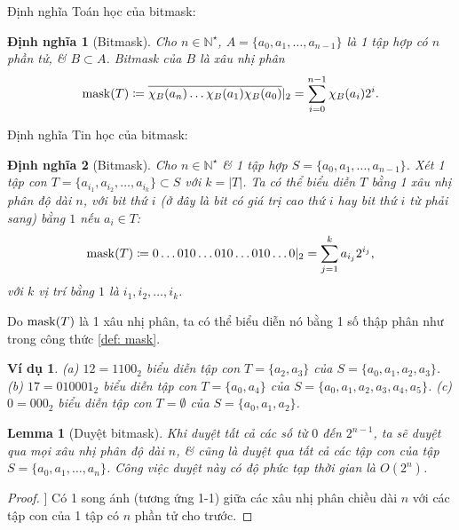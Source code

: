 \documentclass{article}
\newtheorem{dinhnghia}{Định nghĩa}
\newtheorem{lemma}{Lemma}
\newtheorem{vidu}{Ví dụ}
\begin{document}
Định nghĩa Toán học của bitmask:

\begin{dinhnghia}[Bitmask]
    Cho $n\in\mathbb{N}^\star$, $A = \{a_0,a_1,\ldots,a_{n-1}\}$ là 1 tập hợp có $n$ phần tử, \& $B\subset A$. {\rm Bitmask} của $B$ là xâu nhị phân
    \begin{equation*}
        {\rm mask}(T)\coloneqq\overline{\chi_B(a_n)\ldots\chi_B(a_1)\chi_B(a_0)}|_2 = \sum_{i=0}^{n-1} \chi_B(a_i)2^i.
    \end{equation*}
\end{dinhnghia}
Định nghĩa Tin học của bitmask:

\begin{dinhnghia}[Bitmask]
    Cho $n\in\mathbb{N}^\star$ \& 1 tập hợp $S = \{a_0,a_1,\ldots,a_{n-1}\}$. Xét 1 tập con $T = \{a_{i_1},a_{i_2},\ldots,a_{i_k}\}\subset S$ với $k = |T|$. Ta có thể biểu diễn $T$ bằng 1 xâu nhị phân độ dài $n$, với bit thứ $i$ (ở đây là bit có giá trị cao thứ $i$ hay bit thứ $i$ từ phải sang) bằng $1$ nếu $a_i\in T$:
    \begin{equation}
        \label{def: mask}
        {\rm mask}(T)\coloneqq0\ldots010\ldots010\ldots010\ldots0|_2 = \sum_{j=1}^k a_{i_j}2^{i_j},
    \end{equation}
     với $k$ vị trí bằng $1$ là $i_1,i_2,\ldots,i_k$.
\end{dinhnghia}
Do ${\rm mask}(T)$ là 1 xâu nhị phân, ta có thể biểu diễn nó bằng 1 số thập phân như trong công thức \eqref{def: mask}.

\begin{vidu}
    (a) $12 = 1100_2$ biểu diễn tập con $T = \{a_2,a_3\}$ của $S = \{a_0,a_1,a_2,a_3\}$. (b) $17 = 010001_2$ biểu diễn tập con $T = \{a_0,a_4\}$ của $S = \{a_0,a_1,a_2,a_3,a_4,a_5\}$. (c) $0 = 000_2$ biểu diễn tập con $T = \emptyset$ của $S = \{a_0,a_1,a_2\}$.
\end{vidu}

\begin{lemma}[Duyệt bitmask]
    Khi duyệt tất cả các số từ $0$ đến $2^{n-1}$, ta sẽ duyệt qua mọi xâu nhị phân độ dài $n$, \& cũng là duyệt qua tất cả các tập con của tập $S = \{a_0,a_1,\ldots,a_n\}$. Công việc duyệt này có độ phức tạp thời gian là $O(2^n)$.
\end{lemma}

\begin{proof}]
    Có 1 song ánh (tương ứng 1-1) giữa các xâu nhị phân chiều dài $n$ với các tập con của 1 tập có $n$ phần tử cho trước.
\end{proof}
\end{document}
